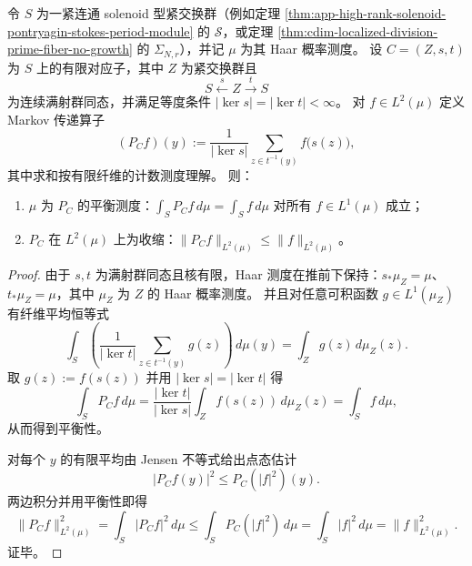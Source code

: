 
\begin{corollary}\label{cor:app-solenoid-stokes-equilibrium-markov-contraction}
令 \(S\) 为一紧连通 solenoid 型紧交换群（例如定理 \ref{thm:app-high-rank-solenoid-pontryagin-stokes-period-module} 的 \(\mathcal S\)，或定理 \ref{thm:cdim-localized-division-prime-fiber-no-growth} 的 \(\Sigma_{N,r}\)），并记 \(\mu\) 为其 Haar 概率测度。
设 \(C=(Z,s,t)\) 为 \(S\) 上的有限对应子，其中 \(Z\) 为紧交换群且
\[
S\xleftarrow{s}Z\xrightarrow{t}S
\]
为连续满射群同态，并满足等度条件 \(|\ker s|=|\ker t|<\infty\)。
对 \(f\in L^2(\mu)\) 定义 Markov 传递算子
\[
(P_C f)(y):=\frac{1}{|\ker s|}\sum_{z\in t^{-1}(y)} f\bigl(s(z)\bigr),
\]
其中求和按有限纤维的计数测度理解。
则：
\begin{enumerate}
  \item \(\mu\) 为 \(P_C\) 的平衡测度：\(\int_S P_C f\,d\mu=\int_S f\,d\mu\) 对所有 \(f\in L^1(\mu)\) 成立；
  \item \(P_C\) 在 \(L^2(\mu)\) 上为收缩：\(\|P_C f\|_{L^2(\mu)}\le \|f\|_{L^2(\mu)}\)。
\end{enumerate}
\end{corollary}

\begin{proof}
由于 \(s,t\) 为满射群同态且核有限，Haar 测度在推前下保持：\(s_\ast \mu_Z=\mu\)、\(t_\ast \mu_Z=\mu\)，其中 \(\mu_Z\) 为 \(Z\) 的 Haar 概率测度。
并且对任意可积函数 \(g\in L^1(\mu_Z)\) 有纤维平均恒等式
\[
\int_S \left(\frac{1}{|\ker t|}\sum_{z\in t^{-1}(y)} g(z)\right)\,d\mu(y)
=
\int_Z g(z)\,d\mu_Z(z).
\]
取 \(g(z):=f(s(z))\) 并用 \(|\ker s|=|\ker t|\) 得
\[
\int_S P_C f\,d\mu
=
\frac{|\ker t|}{|\ker s|}\int_Z f(s(z))\,d\mu_Z(z)
=
\int_S f\,d\mu,
\]
从而得到平衡性。
\par
对每个 \(y\) 的有限平均由 Jensen 不等式给出点态估计
\[
|P_C f(y)|^2\le P_C(|f|^2)(y).
\]
两边积分并用平衡性即得
\[
\|P_C f\|_{L^2(\mu)}^{2}
=\int_S |P_C f|^2\,d\mu
\le \int_S P_C(|f|^2)\,d\mu
=\int_S |f|^2\,d\mu
=\|f\|_{L^2(\mu)}^{2}.
\]
证毕。
\end{proof}

\endinput

